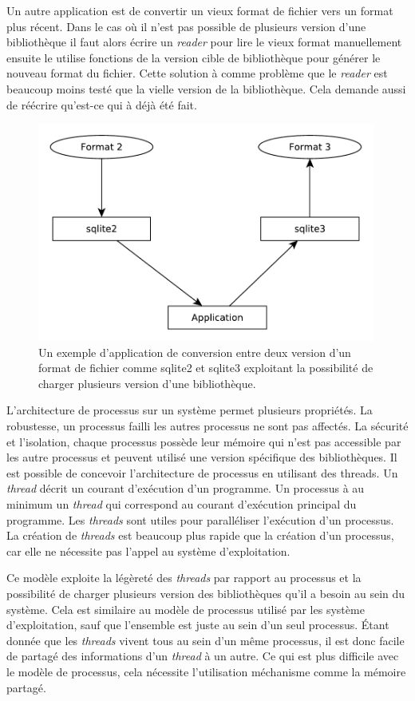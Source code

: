 \documentclass[12pt,initial,twoside,maitrise]{dms}
\numberwithin{equation}{section}
\numberwithin{table}{chapter}
\numberwithin{figure}{chapter}
\begin{document}
Un autre application est de convertir un vieux format de fichier vers un format
plus récent. Dans le cas où il n'est pas possible de plusieurs version d'une bibliothèque
il faut alors écrire un \textit{reader} pour lire le vieux format manuellement ensuite le
utilise fonctions de la version cible de bibliothèque pour générer le nouveau format du fichier.
Cette solution à comme problème que le \textit{reader} est beaucoup moins testé que la
vielle version de la bibliothèque. Cela demande aussi de réécrire qu'est-ce qui à déjà été fait.

\begin{figure}[ht]
  \includegraphics[width=30em]{figures/app_convert_v1_to_v2.pdf}
  \caption{Un exemple d'application de conversion entre deux version d'un format
  de fichier comme sqlite2 et sqlite3 exploitant la possibilité de charger plusieurs
  version d'une bibliothèque.}
\end{figure}


L'architecture de processus sur un système permet plusieurs propriétés. La
robustesse, un processus failli les autres processus ne sont pas affectés. La
sécurité et l'isolation, chaque processus possède leur mémoire qui n'est pas
accessible par les autre processus et peuvent utilisé une version spécifique
des bibliothèques. Il est possible de concevoir l'architecture de processus en
utilisant des threads.  Un \textit{thread} décrit un courant d'exécution d'un
programme. Un processus à au minimum un \textit{thread} qui correspond au
courant d'exécution principal du programme. Les \textit{threads} sont utiles
pour paralléliser l'exécution d'un processus. La création de \textit{threads}
est beaucoup plus rapide que la création d'un processus, car elle ne nécessite
pas l'appel au système d'exploitation.

Ce modèle exploite la légèreté des \textit{threads} par rapport au processus et
la possibilité de charger plusieurs version des bibliothèques qu'il a besoin au sein
du système. Cela est similaire au modèle de processus utilisé par les
système d'exploitation, sauf que l'ensemble est juste au sein d'un seul processus.
Étant donnée que les \textit{threads} vivent tous au sein d'un même processus,
il est donc facile de partagé des informations d'un \textit{thread} à un autre.
Ce qui est plus difficile avec le modèle de processus, cela nécessite l'utilisation
méchanisme comme la mémoire partagé.
\end{document}
